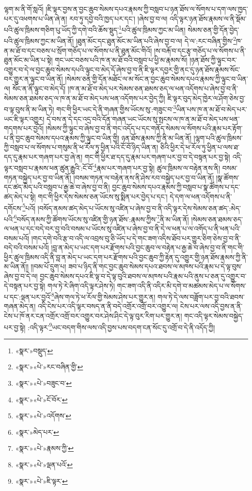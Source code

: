 ལྷག་མ་ནི་གོ་སླའོ། །ཇི་ལྟར་བྱས་ན་བྱང་ཆུབ་སེམས་དཔའ་རྣམས་ཀྱི་བསླབ་པ་ཉན་ཐོས་ལ་སོགས་པ་དག་ལས་ཁྱད་པར་དུ་འཕགས་པ་ཡིན་ཞེ་ན། རབ་ཏུ་དབྱེ་བའི་ཁྱད་པར་དང་། །ཞེས་བྱ་བ་ལ། འདི་ལྟར་ཉན་ཐོས་རྣམས་ལ་ནི་སྡོམ་པའི་ཚུལ་ཁྲིམས་གཅིག་པུ་ཡོད་ཀྱི་དགེ་བའི་ཆོས་སྡུད་\footnote{«སྣར་»བསྡུད་}པའི་ཚུལ་ཁྲིམས་ཀྱང་མ་ཡིན། སེམས་ཅན་གྱི་དོན་བྱེད་པའི་ཚུལ་ཁྲིམས་ཀྱང་མ་ཡིན་ནོ། །ཐུན་མོང་དང་ཐུན་མོང་མ་ཡིན་པའི་ཞེས་བྱ་བ་ལ། དེ་ལ་:རང་བཞིན་གྱིས་\footnote{«སྣར་»«པེ་»རང་བཞིན་གྱི་}ཁ་ན་མ་ཐོ་བ་དང་བཅས་པ་སྲོག་གཅོད་པ་ལ་སོགས་པ་ནི་ཐུན་མོང་གིའོ། །ས་བརྐོ་བ་དང་རྩྭ་གཅོད་པ་ལ་སོགས་པ་ནི་ཐུན་མོང་མ་ཡིན་པ་སྟེ། གང་ཡང་བཅས་པའི་ཁ་ན་མ་ཐོ་བའི་བསླབ་པ་ཕྱི་མ་རྣམས་སོ། །ཉན་ཐོས་ཀྱི་ལྟུང་བར་འགྱུར་བ་དེ་ལ་བྱང་ཆུབ་སེམས་དཔའི་ལྟུང་བ་མེད་དོ་ཞེས་བྱ་བ་ནི་ཇི་ལྟར་དབྱར་གྱི་ནང་དུ་ཉན་ཐོས་རྣམས་སོང་བར་གྱུར་ན་ལྟུང་བ་ཡིན་ནོ། །སེམས་ཅན་གྱི་དོན་མཐོང་ལ་མ་སོང་ན་བྱང་ཆུབ་སེམས་དཔའ་རྣམས་ཀྱི་ལྟུང་བ་ཡིན་ལ། སོང་ན་ནི་ལྟུང་བ་མེད་དོ། །ཁ་ན་མ་ཐོ་བ་མེད་པར་སེམས་ཅན་ཐམས་ཅད་ལ་ཕན་འདོགས་པ་ཞེས་བྱ་བ་ནི་སེམས་ཅན་ཐམས་ཅད་ལ་ཁ་ན་མ་ཐོ་བ་མེད་པས་ཕན་འདོགས་པར་བྱེད་ཀྱི། ཇི་ལྟར་བུད་མེད་ཁྱེར་ལ་ཤོག་ཅེས་བྱ་བ་ལྟ་བུས་ནི་མ་ཡིན་ཏེ། གང་གི་ཕྱིར་ཡང་དེ་ནི་གཞན་གྱིས་ཡོངས་སུ་:གཟུང་བ་\footnote{«སྣར་»«པེ་»བཟུང་བ་}ཡིན་པས་ཁ་ན་མ་ཐོ་བ་མེད་པར་ཡང་ཇི་ལྟར་འགྱུར། དེ་བས་ན་དེ་དང་འདྲ་བའི་དོན་གཞན་ཡང་ཡོངས་སུ་སྤངས་ལ་ཁ་ན་མ་ཐོ་བ་མེད་པས་ཕན་གདགས་པར་བྱའོ། །སེམས་ཀྱི་ལྟུང་བ་ཞེས་བྱ་བ་ནི་གང་འདོད་པ་དང་གནོད་སེམས་ལ་སོགས་པའི་རྣམ་པར་རྟོག་པ་ནི་བྱང་ཆུབ་སེམས་དཔའ་རྣམས་ཀྱི་ལྟུང་བ་ཡིན་གྱི། ཉན་ཐོས་རྣམས་ཀྱི་ནི་མ་ཡིན་ནོ། །ལྷག་པའི་ཚུལ་ཁྲིམས་ཀྱི་བསླབ་པ་ལ་སོགས་པ་གསུམ་ནི་ཕ་རོལ་ཏུ་ཕྱིན་པའི་ངོ་བོ་ཉིད་ཡིན་ན། ཅིའི་ཕྱིར་དེ་ཕ་རོལ་ཏུ་ཕྱིན་པ་ལས་ཐ་དད་དུ་རྣམ་པར་གཞག་པར་བྱ་ཞེ་ན། གང་གི་ཕྱིར་ཐ་དད་དུ་རྣམ་པར་གཞག་པར་བྱ་བ་དེ་བསྟན་པར་བྱ་སྟེ། འདི་ལྟར་བསླབ་པ་རྣམས་ཕན་ཚུན་རྒྱུའི་:ངོ་བོ་\footnote{«སྣར་»«པེ་»ངོ་བོར་}རྣམ་པར་གཞག་པར་བྱ་སྟེ། ཚུལ་ཁྲིམས་ལ་བརྟེན་ནས་ནི། བསམ་གཏན་བསྐྱེད་པར་བྱ་བ་ཡིན་ནོ། །བསམ་གཏན་ལ་བརྟེན་ནས་ནི་ཤེས་རབ་བསྐྱེད་པར་བྱ་བ་ཡིན་ནོ། །སྣ་ཚོགས་དང་ཚད་མེད་པའི་བསླབ་པ་རྒྱ་ཆེ་བ་ཞེས་བྱ་བ་ནི། བྱང་ཆུབ་སེམས་དཔའ་རྣམས་ཀྱི་བསླབ་པ་སྣ་ཚོགས་པ་དང་ཚད་མེད་པ་སྟེ། གང་གི་ཕྱིར་དེས་སེམས་ཅན་ཡོངས་སུ་སྨིན་པར་བྱེད་པ་དང་། དེ་དག་ལ་ཕན་འདོགས་པ་ནི་དགོངས་\footnote{«སྣར་»«པེ་»འདོགས་}པའོ། །བསོད་ནམས་ཚད་མེད་པ་ཡོངས་སུ་འཛིན་པ་ཞེས་བྱ་བ་ནི་འདི་ལྟར་དེས་སེམས་ཅན་ཚད་:མེད་པའི་\footnote{«སྣར་»མེད་པར་}བསོད་ནམས་ཀྱི་ཚོགས་ཡོངས་སུ་འཛིན་གྱི་ཉན་ཐོས་:རྣམས་ཀྱིས་\footnote{«སྣར་»«པེ་»རྣམས་ཀྱི་}ནི་མ་ཡིན་ནོ། །སེམས་ཅན་ཐམས་ཅད་ལ་ཕན་པ་དང་བདེ་བར་བྱ་བའི་བསམ་པ་ཡོངས་སུ་འཛིན་པ་ཞེས་བྱ་བ་ནི་དེ་ལ་ཕན་པ་ལ་འགོད་པ་ནི་ཕན་པའི་བསམ་པའོ། །གང་དགེ་བའི་རྩ་བ་འདི་ལ་འབྲས་བུ་ཅི་ཡོད་པ་དེ་གང་ཟག་འདིས་ཐོབ་པར་གྱུར་ཅིག་ཅེས་བྱ་བ་ནི་བདེ་བའི་བསམ་པའོ། །བླ་ན་མེད་པ་ཡང་དག་པར་རྫོགས་པའི་བྱང་ཆུབ་ལ་བརྟེན་པ་རྒྱ་ཆེ་བ་ཞེས་བྱ་བ་ནི་གང་གི་ཕྱིར་ཚུལ་ཁྲིམས་འདི་ནི་བླ་ན་མེད་པ་ཡང་དག་པར་རྫོགས་པའི་བྱང་ཆུབ་ཀྱི་རྟེན་དུ་འགྱུར་གྱི་ཉན་ཐོས་རྣམས་ཀྱི་ནི་མ་ཡིན་ནོ།། །།བམ་པོ་དྲུག་པ། ཟབ་པ་ཉིད་ནི་གང་བྱང་ཆུབ་སེམས་དཔའ་ཐབས་ལ་མཁས་པའི་རྣམ་པ་དེ་ལྟ་བུས་ཞེས་བྱ་བ་དེ་ལ། བྱང་ཆུབ་སེམས་དཔའ་ཇི་ལྟ་བ་དེ་ལྟ་བུའི་ཐབས་ལ་མཁས་པའི་རྣམ་པའི་ནུས་པ་ཅན་དུ་འགྱུར་བ་དེ་བསྟན་པར་བྱ་སྟེ། གལ་ཏེ་རེ་ཞིག་འདི་ལྟར་ཤེས་ཏེ། གང་ཟག་འདི་ནི་འདིར་མི་དགེ་བ་མཚམས་མེད་པ་ལ་སོགས་པ་དང་:ལྡན་པར་བྱའོ་\footnote{«སྣར་»«པེ་»ལྡན་པའོ་}ཞེས་གལ་ཏེ་ཕ་རོལ་གྱི་སེམས་ཤེས་པར་གྱུར་ན། གལ་ཏེ་དེ་ལས་བཟློག་པར་བྱ་བའི་ཐབས་གཞན་མེད་ན། འདི་ངེས་པར་འདི་ལྟར་བསད་ན་ནི་བདེ་འགྲོར་འགྲོ་བར་འགྱུར་ལ། ངེས་པར་ལས་འདི་བྱས་ན་ནི་ངེས་པ་ཁོ་ནར་ངན་འགྲོར་འགྲོ་བར་འགྱུར་བར་ཤེས་ཤིང་དེ་ལྟ་བུར་རིག་པར་གྱུར་ན། གང་འདི་ལྟར་སེམས་བསྐྱེད་པར་བྱ་སྟེ། :འདི་ལྟར་\footnote{«སྣར་»«པེ་»ཇི་ལྟར་}ཡང་བདག་གིས་ལས་འདི་བྱས་པས་བདག་ངན་སོང་དུ་འགྲོ་བ་དེ་ནི་འདོད་ཀྱི། 